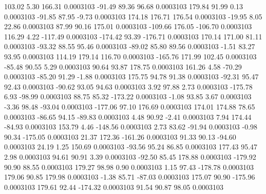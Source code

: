       103.02        5.30      166.31     0.0003103
      -91.49       89.36       96.68     0.0003103
      179.84       91.99        0.13     0.0003103
      -91.85       87.95       -9.73     0.0003103
      174.18      176.71      176.54     0.0003103
      -19.95        8.05       22.86     0.0003103
       87.99       90.16      175.01     0.0003103
     -109.66      176.05     -106.70     0.0003103
      116.29        4.22     -117.49     0.0003103
     -174.42       93.39     -176.71     0.0003103
      170.14      171.00       81.11     0.0003103
      -93.32       88.55       95.46     0.0003103
      -89.02       85.80       89.56     0.0003103
       -1.51       83.27       93.95     0.0003103
      114.19      179.14      116.70     0.0003103
     -165.76      171.99      102.45     0.0003103
      -85.48       90.55        5.29     0.0003103
       90.64       93.87      178.75     0.0003103
      161.26        4.58      -70.29     0.0003103
      -85.20       91.29       -1.88     0.0003103
      175.75       94.78       91.38     0.0003103
      -92.31       95.47       92.43     0.0003103
      -90.62       93.05       94.63     0.0003103
        3.92       97.88        2.73     0.0003103
     -175.78        6.93      -98.99     0.0003103
       88.75       85.32     -173.22     0.0003103
       -1.08       93.85        3.67     0.0003103
       -3.36       98.48      -93.04     0.0003103
     -177.06       97.10      176.69     0.0003103
      174.01      174.88       78.65     0.0003103
      -86.65       94.15      -89.83     0.0003103
        4.48       90.92       -2.41     0.0003103
        7.94      174.44      -84.93     0.0003103
      153.79        4.46     -148.56     0.0003103
        2.73       83.62      -91.94     0.0003103
       -0.98       90.34     -175.05     0.0003103
       21.37      172.36     -161.26     0.0003103
       91.33       90.13      -94.60     0.0003103
       24.19        1.25      150.69     0.0003103
      -93.56       95.24       86.85     0.0003103
      177.43       95.47        2.98     0.0003103
       94.61       90.91        3.39     0.0003103
      -92.50       85.45      178.88     0.0003103
     -179.92       90.90       88.55     0.0003103
      179.27       98.98        0.90     0.0003103
        1.15       97.43     -178.78     0.0003103
      179.06       90.85      179.98     0.0003103
       -1.38       85.71      -87.03     0.0003103
      175.07       90.90     -175.96     0.0003103
      179.61       92.44     -174.32     0.0003103
       91.54       90.87       98.05     0.0003103
